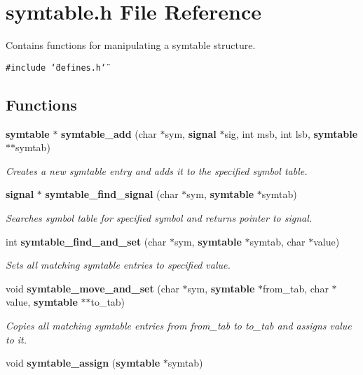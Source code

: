 \section{symtable.h File Reference}
\label{symtable_8h}
Contains functions for manipulating a symtable structure.  


{\tt \#include \char`\"{}defines.h\char`\"{}}\par
\subsection*{Functions}
\begin{CompactItemize}
\item 
{\bf symtable} $\ast$ {\bf symtable\_\-add} (char $\ast$sym, {\bf signal} $\ast$sig, int msb, int lsb, {\bf symtable} $\ast$$\ast$symtab)
\begin{CompactList}\small\item\em Creates a new symtable entry and adds it to the specified symbol table. \item\end{CompactList}\item 
{\bf signal} $\ast$ {\bf symtable\_\-find\_\-signal} (char $\ast$sym, {\bf symtable} $\ast$symtab)
\begin{CompactList}\small\item\em Searches symbol table for specified symbol and returns pointer to signal. \item\end{CompactList}\item 
int {\bf symtable\_\-find\_\-and\_\-set} (char $\ast$sym, {\bf symtable} $\ast$symtab, char $\ast$value)
\begin{CompactList}\small\item\em Sets all matching symtable entries to specified value. \item\end{CompactList}\item 
void {\bf symtable\_\-move\_\-and\_\-set} (char $\ast$sym, {\bf symtable} $\ast$from\_\-tab, char $\ast$value, {\bf symtable} $\ast$$\ast$to\_\-tab)
\begin{CompactList}\small\item\em Copies all matching symtable entries from from\_\-tab to to\_\-tab and assigns value to it. \item\end{CompactList}\item 
void {\bf symtable\_\-assign} ({\bf symtable} $\ast$symtab)

\end{CompactItemize}
